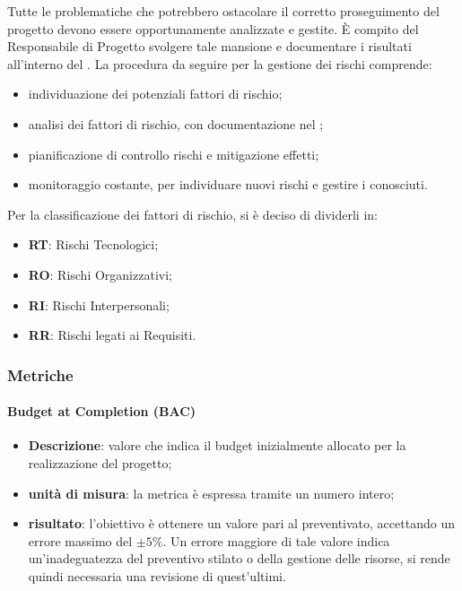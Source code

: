 			Tutte le problematiche che potrebbero ostacolare il corretto proseguimento del progetto devono essere opportunamente analizzate e gestite. È compito del Responsabile di Progetto svolgere tale mansione e documentare i risultati all'interno del . La procedura da seguire per la gestione dei rischi comprende:
			\begin{itemize}
				\item individuazione dei potenziali fattori di rischio;
				\item analisi dei fattori di rischio, con documentazione nel ;
				\item pianificazione di controllo rischi e mitigazione effetti;
				\item monitoraggio costante, per individuare nuovi rischi e gestire i conosciuti.
			\end{itemize}
			Per la classificazione dei fattori di rischio, si è deciso di dividerli in:
			\begin{itemize}
				\item \textbf{RT}: Rischi Tecnologici;
				\item \textbf{RO}: Rischi Organizzativi;
				\item \textbf{RI}: Rischi Interpersonali;
				\item \textbf{RR}: Rischi legati ai Requisiti.
			\end{itemize}
		\subsubsection{Metriche}
				\paragraph{Budget at Completion (BAC)}
					\begin{itemize}
						\item \textbf{Descrizione}: valore che indica il budget inizialmente allocato per la realizzazione del progetto;
						\item \textbf{unità di misura}: la metrica è espressa tramite un numero intero;
						\item \textbf{risultato}: l'obiettivo è ottenere un valore pari al preventivato, accettando un errore massimo del $\pm{}5\%$. Un errore maggiore di tale valore indica un'inadeguatezza del preventivo stilato o della gestione delle risorse, si rende quindi necessaria una revisione di quest'ultimi.
					\end{itemize}
